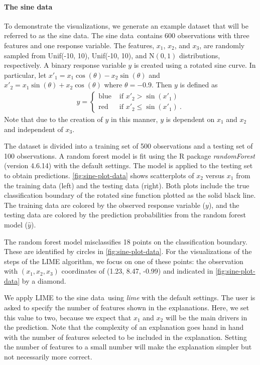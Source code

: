 \documentclass[AMS,STIX2COL]{WileyNJD-v2}\usepackage[]{graphicx}\usepackage[]{color}
\newcommand{\data}{sine data}
\begin{document}
\paragraph{The \data}

To demonstrate the visualizations, we generate an example dataset that will be referred to as the \data. The \data \ contains 600 observations with three features and one response variable. The features, $x_1$, $x_2$, and $x_3$, are randomly sampled from Unif(-10, 10), Unif(-10, 10), and $\mbox{N}(0,1)$ distributions, respectively. A binary response variable $y$ is  created using a rotated sine curve. In particular, let $x'_1=x_1\cos(\theta)-x_2\sin(\theta)$ and $x'_2=x_1\sin(\theta)+x_2\cos(\theta)$ where $\theta=-0.9$. Then $y$ is defined as
\begin{eqnarray}\label{eq:data}
  y=\begin{cases}
  \mbox{blue} & \mbox{ if } x'_2 > \sin\left(x'_1\right) \\
  \mbox{red} & \mbox{ if } x'_2 \le \sin\left(x'_1\right) \ . %
  \end{cases}
\end{eqnarray}
Note that due to the creation of $y$ in this manner, $y$ is dependent on $x_1$ and $x_2$ and independent of $x_3$.

The dataset is divided into a training set of 500 observations and a testing set of 100 observations. A random forest model is fit using the R package \emph{randomForest} (version 4.6.14) \citep{liaw:2002} with the default settings. The model is applied to the testing set to obtain predictions. \autoref{fig:sine-plot-data} shows scatterplots of $x_2$ versus $x_1$ from the training data (left) and the testing data (right). Both plots include the true classification boundary of the rotated sine function plotted as the solid black line. The training data are colored by the observed response variable ($y$), and the testing data are colored by the prediction probabilities from the random forest model ($\hat{y}$).

The random forest model misclassifies 18 points on the classification boundary. These are identified by circles in \autoref{fig:sine-plot-data}. For the visualizations of the steps of the LIME algorithm, we focus on one of these points: the observation with $(x_1, x_2, x_3)$ coordinates of (1.23, 8.47, -0.99) and indicated in \autoref{fig:sine-plot-data} by a diamond.





We apply LIME to the \data \ using \emph{lime} with the default settings. The user is asked to specify the number of features shown in the explanations. Here, we set this value to two, because we expect that $x_1$ and $x_2$ will be the main drivers in the prediction. Note that the complexity of an explanation goes hand in hand with the number of features selected to be included in the explanation. Setting the number of features to a small number will make the explanation simpler but not necessarily more correct.
\end{document}
